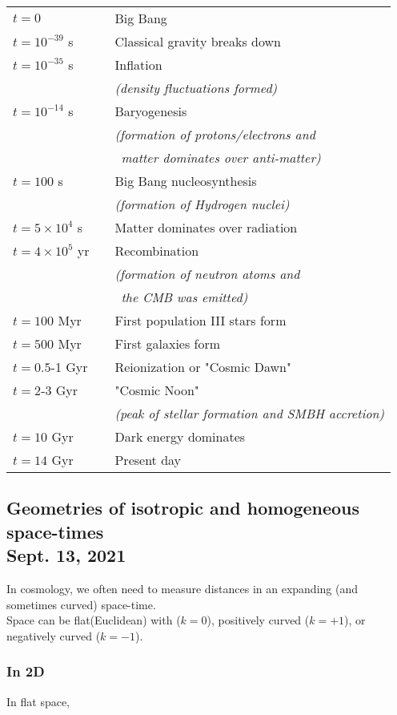 \documentclass[]{article}
\begin{document}
\begin{center}
	\begin{tabular}{lcl}
		$t = 0$ & & Big Bang \\
		$t = 10^{-39}$ s & & Classical gravity breaks down \\
		$t = 10^{-35}$ s & & Inflation \\ 
						 & & \textit{(density fluctuations formed)} \\
		$t = 10^{-14}$ s & & Baryogenesis  \\
						 & & \textit{(formation of protons/electrons and} \\
						 & & ~\textit{matter dominates over anti-matter)}\\
		$t = 100$ s & & Big Bang nucleosynthesis \\
					& & \textit{(formation of Hydrogen nuclei)} \\
		$t = 5 \times 10^{4}$ s & & Matter dominates over radiation \\
		$t = 4 \times 10^{5}$ yr & & Recombination \\
								 & & \textit{(formation of neutron atoms and} \\
								 & & ~\textit{the CMB was emitted)} \\
		$t = 100$ Myr & & First population III stars form \\
		$t = 500$ Myr & & First galaxies form \\
		$t = 0.5$-1 Gyr & & Reionization or "Cosmic Dawn" \\
		$t = 2$-3 Gyr & & "Cosmic Noon" \\ 
					  & & \textit{(peak of stellar formation and SMBH accretion)} \\
		$t = 10$ Gyr & & Dark energy dominates \\
		$t = 14$ Gyr & & Present day \\
	\end{tabular}
\end{center}\bigbreak

\subsection{Geometries of isotropic and homogeneous space-times\\ {\large \normalfont Sept. 13, 2021}}
\bigbreak

In cosmology, we often need to measure distances in an expanding (and sometimes curved) space-time.\\

Space can be flat(Euclidean) with ($k = 0$), positively curved ($k = +1$), or negatively curved ($k = -1$).

\subsubsection{In 2D}
\bigbreak

In flat space, 
\end{document}
